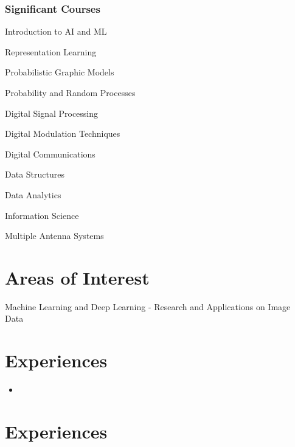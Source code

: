 \documentclass[11pt]{article} %
\begin{document}
\subsubsection{Significant Courses}
\begin{inparaitem}[\hspace{2mm} •]
\item Introduction to AI and ML
\item Representation Learning
\item Probabilistic Graphic Models
\item Probability and Random Processes
\item Digital Signal Processing
\item Digital Modulation Techniques
\item Digital Communications
\item Data Structures 
\item Data Analytics
\item Information Science
\item Multiple Antenna Systems
\end{inparaitem}



\hline 

\section{Areas of Interest}
Machine Learning and Deep Learning - Research and Applications on Image Data 

\vspace{3mm}
\hline

\section{Experiences}
\begin{itemize}
    \item 
\end{itemize}

\section{Experiences}
\end{document}
